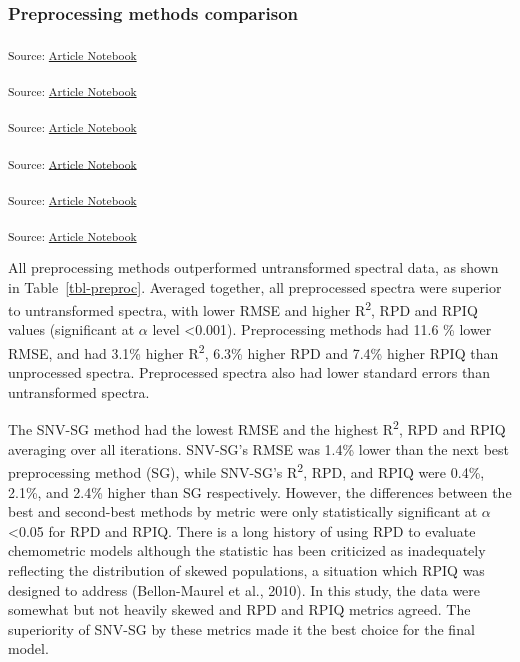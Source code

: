 \documentclass[
]{agujournal2019}
\begin{document}
\subsubsection{Preprocessing methods
comparison}\label{preprocessing-methods-comparison}

\textsubscript{Source:
\href{https://rvcrawford.github.io/glowing-system/index.qmd.html}{Article
Notebook}}

\textsubscript{Source:
\href{https://rvcrawford.github.io/glowing-system/index.qmd.html}{Article
Notebook}}

\textsubscript{Source:
\href{https://rvcrawford.github.io/glowing-system/index.qmd.html}{Article
Notebook}}

\textsubscript{Source:
\href{https://rvcrawford.github.io/glowing-system/index.qmd.html}{Article
Notebook}}

\textsubscript{Source:
\href{https://rvcrawford.github.io/glowing-system/index.qmd.html}{Article
Notebook}}

\textsubscript{Source:
\href{https://rvcrawford.github.io/glowing-system/index.qmd.html}{Article
Notebook}}

All preprocessing methods outperformed untransformed spectral data, as
shown in Table~\ref{tbl-preproc}. Averaged together, all preprocessed
spectra were superior to untransformed spectra, with lower RMSE and
higher R\textsuperscript{2}, RPD and RPIQ values (significant at
\(\alpha\) level \textless0.001). Preprocessing methods had 11.6 \%
lower RMSE, and had 3.1\% higher R\textsuperscript{2}, 6.3\% higher RPD
and 7.4\% higher RPIQ than unprocessed spectra. Preprocessed spectra
also had lower standard errors than untransformed spectra.

The SNV-SG method had the lowest RMSE and the highest
R\textsuperscript{2}, RPD and RPIQ averaging over all iterations.
SNV-SG's RMSE was 1.4\% lower than the next best preprocessing method
(SG), while SNV-SG's R\textsuperscript{2}, RPD, and RPIQ were 0.4\%,
2.1\%, and 2.4\% higher than SG respectively. However, the differences
between the best and second-best methods by metric were only
statistically significant at \(\alpha\) \textless0.05 for RPD and RPIQ.
There is a long history of using RPD to evaluate chemometric models
although the statistic has been criticized as inadequately reflecting
the distribution of skewed populations, a situation which RPIQ was
designed to address (Bellon-Maurel et al., 2010). In this study, the
data were somewhat but not heavily skewed and RPD and RPIQ metrics
agreed. The superiority of SNV-SG by these metrics made it the best
choice for the final model.
\end{document}
